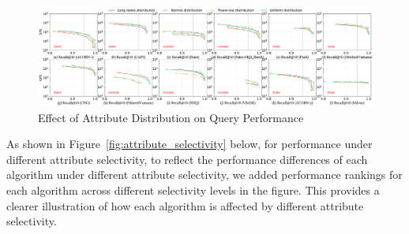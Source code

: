 \documentclass[sigconf, nonacm]{acmart}
\begin{document}
\begin{figure}[t]  %
	\centering
	\includegraphics[width=\linewidth]{fig/exp_3_1.pdf}
	\caption{Effect of Attribute Distribution on Query Performance}
	\label{fig:attribute_distribution}
\end{figure}

As shown in Figure~\ref{fig:attribute_selectivity} below, for performance under different attribute selectivity, to reflect the performance differences of each algorithm under different attribute selectivity, we added performance rankings for each algorithm across different selectivity levels in the figure. This provides a clearer illustration of how each algorithm is affected by different attribute selectivity.

\end{document}
